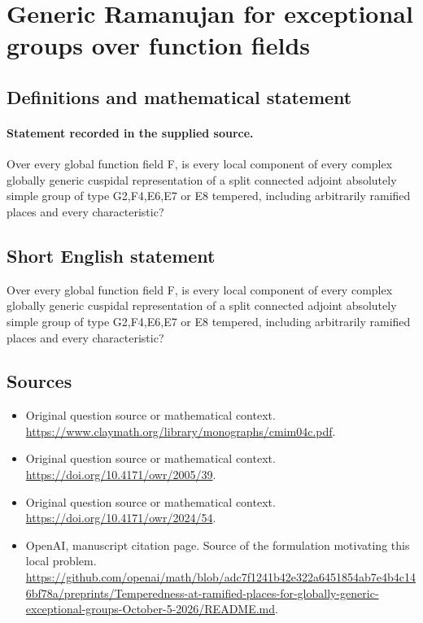 \documentclass[11pt]{article}
\begin{document}
\section*{Generic Ramanujan for exceptional groups over function fields}\label{statement}
\subsection{Definitions and mathematical statement}
\paragraph{Statement recorded in the supplied source.}
Over every global function field F, is every local component of every complex globally generic cuspidal representation of a split connected adjoint absolutely simple group of type G2,F4,E6,E7 or E8 tempered, including arbitrarily ramified places and every characteristic?
\subsection{Short English statement}
Over every global function field F, is every local component of every complex globally generic cuspidal representation of a split connected adjoint absolutely simple group of type G2,F4,E6,E7 or E8 tempered, including arbitrarily ramified places and every characteristic?
\subsection{Sources}
\begin{itemize}
\item[S1] Original question source or mathematical context.
\url{https://www.claymath.org/library/monographs/cmim04c.pdf}.
\item[S2] Original question source or mathematical context.
\url{https://doi.org/10.4171/owr/2005/39}.
\item[S3] Original question source or mathematical context.
\url{https://doi.org/10.4171/owr/2024/54}.
\item[S4] OpenAI, manuscript citation page. Source of the formulation motivating this local problem.
\url{https://github.com/openai/math/blob/adc7f1241b42e322a6451854ab7e4b4c146bf78a/preprints/Temperedness-at-ramified-places-for-globally-generic-exceptional-groups-October-5-2026/README.md}.
\end{itemize}
\end{document}
